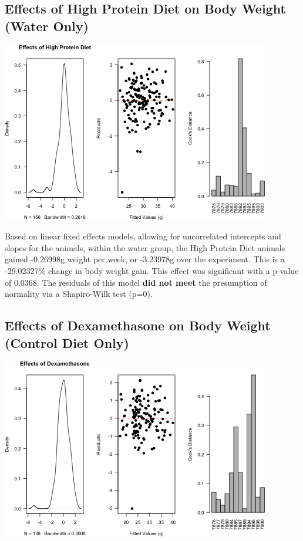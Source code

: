 \documentclass[]{article}
\begin{document}
\subsection{Effects of High Protein Diet on Body Weight (Water
Only)}\label{effects-of-high-protein-diet-on-body-weight-water-only}

\includegraphics{figures/diagnostics-body-weight-1.png}

Based on linear fixed effects models, allowing for uncorrelated
intercepts and slopes for the animals, within the water group, the High
Protein Diet animals gained -0.26998g weight per week, or -3.23978g over
the experiment. This is a -29.02327\% change in body weight gain. This
effect was significant with a p-value of 0.0368. The residuals of this
model \textbf{did not meet} the presumption of normality via a
Shapiro-Wilk test (p=0).

\subsection{Effects of Dexamethasone on Body Weight (Control Diet
Only)}\label{effects-of-dexamethasone-on-body-weight-control-diet-only}

\includegraphics{figures/cooks-distance-dex-1.png}
\end{document}
